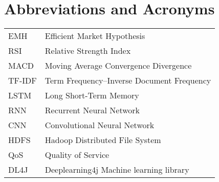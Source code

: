 \chapter*{Abbreviations and Acronyms}


\noindent
\begin{longtable}{@{}p{}p{}@{}}
EMH & Efficient Market Hypothesis \\
RSI & Relative Strength Index \\
MACD & Moving Average Convergence Divergence \\
TF-IDF & Term Frequency–Inverse Document Frequency \\
LSTM & Long Short-Term Memory \\
RNN & Recurrent Neural Network \\
CNN & Convolutional Neural Network \\
HDFS & Hadoop Distributed File System \\
QoS & Quality of Service \\
DL4J & Deeplearning4j Machine learning library \\

\end{longtable}
